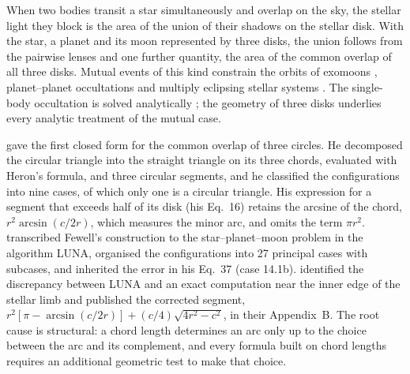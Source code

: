 \documentclass[twocolumn]{aastex701}
\begin{document}
When two bodies transit a star simultaneously and overlap on the sky, the
stellar light they block is the area of the union of their shadows on the
stellar disk. With the star, a planet and its moon represented by three
disks, the union follows from the pairwise lenses and one further
quantity, the area of the common overlap of all three disks. Mutual events
of this kind constrain the orbits of exomoons \citep{CabreraSchneider2007,
Kipping2011, HippkeHeller2022, Kalman2023}, planet--planet occultations
\citep{Luger2017} and multiply eclipsing stellar systems
\citep{Short2018}. The single-body occultation is solved analytically
\citep{MandelAgol2002, Agol2020, Luger2019}; the geometry of three disks
underlies every analytic treatment of the mutual case.

\citet{Fewell2006} gave the first closed form for the common overlap of
three circles. He decomposed the circular triangle into the straight
triangle on its three chords, evaluated with Heron's formula, and three
circular segments, and he classified the configurations into nine cases,
of which only one is a circular triangle. His expression for a segment
that exceeds half of its disk (his Eq.~16) retains the arcsine of the
chord, $r^2\arcsin(c/2r)$, which measures the minor arc, and omits the
term $\pi r^2$. \citet{Kipping2011} transcribed Fewell's construction to
the star--planet--moon problem in the algorithm LUNA, organised the
configurations into 27 principal cases with subcases, and inherited the
error in his Eq.~37 (case 14.1b). \citet{GordonAgol2022} identified the
discrepancy between LUNA and an exact computation near the inner edge of
the stellar limb and published the corrected segment,
$r^2[\pi-\arcsin(c/2r)] + (c/4)\sqrt{4r^2-c^2}$, in their Appendix~B. The
root cause is structural: a chord length determines an arc only up to the
choice between the arc and its complement, and every formula built on
chord lengths requires an additional geometric test to make that choice.
\end{document}
